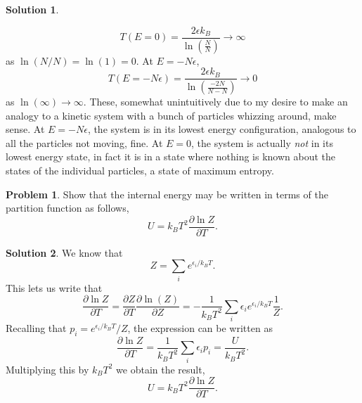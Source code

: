 \documentclass[10pt]{article}
\theoremstyle{definition}
\newtheorem{problem}{Problem}
\newtheorem{soln}{Solution}
\begin{document}
\begin{soln}
\begin{enumerate}[label=(\alph*)]
          $$T(E=0)=\frac{2\epsilon k_B}{\ln(\frac{N}{N})}\to \infty$$
          as $\ln(N/N)=\ln(1)=0$.
          At $E=-N\epsilon$,
          $$T(E=-N\epsilon)=\frac{2\epsilon k_B}{\ln(\frac{-2N}{N-N})}\to 0$$
          as $\ln(\infty)\to \infty$. These, somewhat unintuitively due to my desire to make an analogy to a
          kinetic system with a bunch of particles whizzing around, make sense. At $E=-N\epsilon$, the system is in its lowest energy configuration,
          analogous to all the particles not moving, fine. At $E=0$, the system is actually \emph{not} in its lowest energy state, in fact it is in a
          state where nothing is known about the states of the individual particles, a state of maximum entropy.
  \end{enumerate}
\end{soln}

\begin{problem}
Show that the internal energy may be written in terms of the partition function as
follows,
$$U=k_BT^2\frac{\partial \ln Z}{\partial T}.$$
\end{problem}
\begin{soln}
We know that 
$$Z=\sum_i e^{\epsilon_i/k_B T}.$$
This lets us write that 
$$\frac{\partial \ln Z}{\partial T}=\frac{\partial Z}{\partial T}\frac{\partial \ln (Z)}{\partial Z}=
-\frac{1}{k_B T^2}\sum_i \epsilon_ie^{\epsilon_i/k_B T}
\frac{1}{Z}.
$$
Recalling that $p_i=e^{\epsilon_i/k_B T}/Z$, the expression can be written as
$$\frac{\partial \ln Z}{\partial T}=\frac{1}{k_B T^2}\sum_i \epsilon_ip_i=\frac{U}{k_BT^2}.$$
Multiplying this by $k_BT^2$ we obtain the result,
$$U=k_BT^2\frac{\partial \ln Z}{\partial T}.$$
\end{soln}
\end{document}
